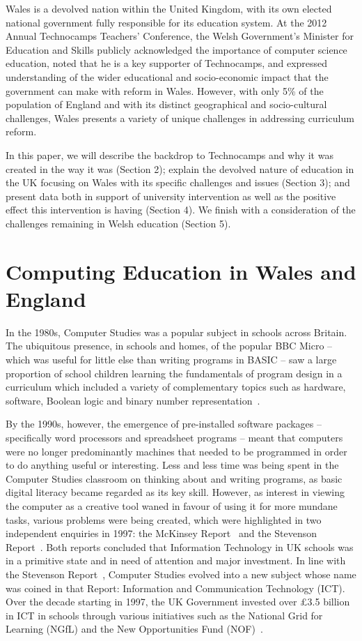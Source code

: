 \documentclass{sig-alternate}
\begin{document}
Wales is a devolved nation within the United Kingdom, with its own
elected national government fully responsible for its education system.
At the 2012 Annual Technocamps Teachers' Conference,
the Welsh Government's Minister for Education and Skills
publicly acknowledged the importance of computer science education,
noted that he is a key supporter of Technocamps,
and expressed understanding of the wider educational and
socio-economic impact that the government can make with reform in Wales.
However, with only 5\% of the population of England and with its distinct
geographical and socio-cultural challenges, Wales presents
a variety of unique challenges in addressing curriculum reform.

In this paper, we will describe the backdrop to Technocamps and why it
was created in the way it was (Section 2); explain the devolved nature
of education in the UK focusing on Wales with its specific challenges
and issues (Section 3); and present data both in support of university
intervention as well as the positive effect this intervention is
having (Section 4).  We finish with a consideration of the challenges
remaining in Welsh education (Section 5).

\section{Computing Education in Wales and England}

In the 1980s, Computer Studies was a popular subject
in schools across Britain. The ubiquitous presence, in schools and homes,
of the popular BBC Micro -- which was useful for little else than
writing programs in BASIC -- saw a large proportion
of school children learning the fundamentals of program design
in a curriculum which included a variety of complementary
topics such as hardware, software, Boolean logic
and binary number representation~\cite{Doyle:1988}.

By the 1990s, however, the emergence of pre-installed software
packages -- specifically word processors and spreadsheet programs --
meant that computers were no longer predominantly machines that needed
to be programmed in order to do anything useful or interesting.  Less
and less time was being spent in the Computer Studies classroom on
thinking about and writing programs, as basic digital literacy became
regarded as its key skill.  However, as interest in viewing the
computer as a creative tool waned in favour of using it for more
mundane tasks, various problems were being created, which were
highlighted in two independent enquiries in 1997: the McKinsey
Report~\cite{McKinsey:1997} and the Stevenson
Report~\cite{Stevenson:1997}.  Both reports concluded that Information
Technology in UK schools was in a primitive state and in need of
attention and major investment.  In line with the Stevenson
Report~\cite{Stevenson:1997}, Computer Studies evolved into a new
subject whose name was coined in that Report: Information and
Communication Technology (ICT).  Over the decade starting in 1997, the
UK Government invested over \pounds3.5 billion in ICT in schools
through various initiatives such as the National Grid for Learning
(NGfL) and the New Opportunities Fund (NOF)~\cite{Doughty:2006}.
\end{document}
